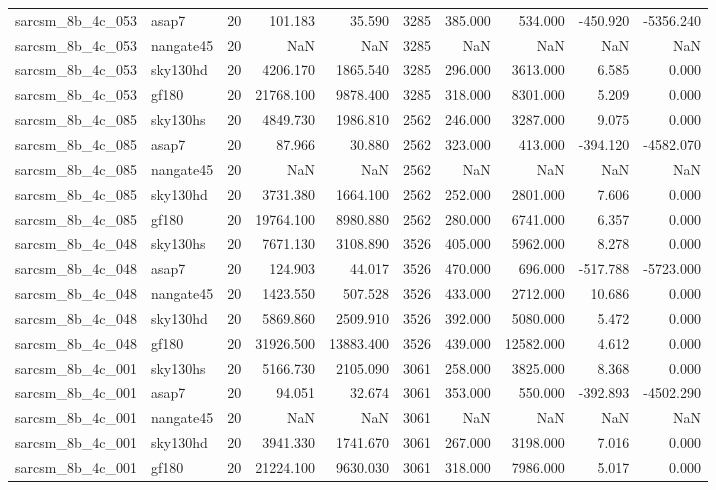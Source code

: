 \begin{tabular}{llrrrrrrrr}
sarcsm\_8b\_4c\_053 & asap7 & 20 & 101.183 & 35.590 & 3285 & 385.000 & 534.000 & -450.920 & -5356.240 \\
sarcsm\_8b\_4c\_053 & nangate45 & 20 & NaN & NaN & 3285 & NaN & NaN & NaN & NaN \\
sarcsm\_8b\_4c\_053 & sky130hd & 20 & 4206.170 & 1865.540 & 3285 & 296.000 & 3613.000 & 6.585 & 0.000 \\
sarcsm\_8b\_4c\_053 & gf180 & 20 & 21768.100 & 9878.400 & 3285 & 318.000 & 8301.000 & 5.209 & 0.000 \\
sarcsm\_8b\_4c\_085 & sky130hs & 20 & 4849.730 & 1986.810 & 2562 & 246.000 & 3287.000 & 9.075 & 0.000 \\
sarcsm\_8b\_4c\_085 & asap7 & 20 & 87.966 & 30.880 & 2562 & 323.000 & 413.000 & -394.120 & -4582.070 \\
sarcsm\_8b\_4c\_085 & nangate45 & 20 & NaN & NaN & 2562 & NaN & NaN & NaN & NaN \\
sarcsm\_8b\_4c\_085 & sky130hd & 20 & 3731.380 & 1664.100 & 2562 & 252.000 & 2801.000 & 7.606 & 0.000 \\
sarcsm\_8b\_4c\_085 & gf180 & 20 & 19764.100 & 8980.880 & 2562 & 280.000 & 6741.000 & 6.357 & 0.000 \\
sarcsm\_8b\_4c\_048 & sky130hs & 20 & 7671.130 & 3108.890 & 3526 & 405.000 & 5962.000 & 8.278 & 0.000 \\
sarcsm\_8b\_4c\_048 & asap7 & 20 & 124.903 & 44.017 & 3526 & 470.000 & 696.000 & -517.788 & -5723.000 \\
sarcsm\_8b\_4c\_048 & nangate45 & 20 & 1423.550 & 507.528 & 3526 & 433.000 & 2712.000 & 10.686 & 0.000 \\
sarcsm\_8b\_4c\_048 & sky130hd & 20 & 5869.860 & 2509.910 & 3526 & 392.000 & 5080.000 & 5.472 & 0.000 \\
sarcsm\_8b\_4c\_048 & gf180 & 20 & 31926.500 & 13883.400 & 3526 & 439.000 & 12582.000 & 4.612 & 0.000 \\
sarcsm\_8b\_4c\_001 & sky130hs & 20 & 5166.730 & 2105.090 & 3061 & 258.000 & 3825.000 & 8.368 & 0.000 \\
sarcsm\_8b\_4c\_001 & asap7 & 20 & 94.051 & 32.674 & 3061 & 353.000 & 550.000 & -392.893 & -4502.290 \\
sarcsm\_8b\_4c\_001 & nangate45 & 20 & NaN & NaN & 3061 & NaN & NaN & NaN & NaN \\
sarcsm\_8b\_4c\_001 & sky130hd & 20 & 3941.330 & 1741.670 & 3061 & 267.000 & 3198.000 & 7.016 & 0.000 \\
sarcsm\_8b\_4c\_001 & gf180 & 20 & 21224.100 & 9630.030 & 3061 & 318.000 & 7986.000 & 5.017 & 0.000 \\

\end{tabular}
